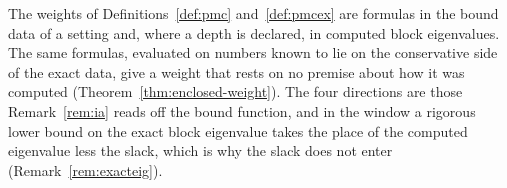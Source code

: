 
The weights of Definitions~\ref{def:pmc} and~\ref{def:pmcex} are formulas in
the bound data of a setting and, where a depth is declared, in computed block
eigenvalues. The same formulas, evaluated on numbers known to lie on the
conservative side of the exact data, give a weight that rests on no premise
about how it was computed (Theorem~\ref{thm:enclosed-weight}). The four
directions are those Remark~\ref{rem:ia} reads off the bound function, and in
the window a rigorous lower bound on the exact block eigenvalue takes the
place of the computed eigenvalue less the slack, which is why the slack does
not enter (Remark~\ref{rem:exacteig}).

